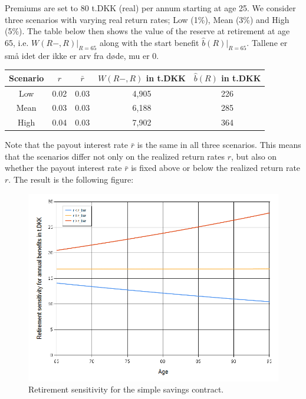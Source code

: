\documentclass{book}
\newcommand{\1}[1]{\mathbbm{1}_{\left\lbrace #1 \right\rbrace}}
\theoremstyle{break}
\theoremstyle{remark}
\numberwithin{equation}{section}
\begin{document}
\begin{example}
Premiums are set to 80 t.DKK (real) per annum starting at age 25. We consider three scenarios with varying real return rates; Low (1\%), Mean (3\%) and High (5\%). The table below then shows the value of the reserve at retirement at age 65, i.e. $W(R-,R)|_{R=65}$ along with the start benefit $\hat{b}(R)|_{R=65}$. Tallene er små idet der ikke er arv fra døde, mu er 0.

\begin{center}
	\begin{tabular}{ |c|c|c|c|c| }
		\hline
		Scenario & $r$ & $\bar{r}$ & $W(R-,R)$ in t.DKK & $\hat{b}(R)$ in t.DKK \\
		\hline
		Low & 0.02 & 0.03 & 4,905 & 226 \\
		Mean & 0.03 & 0.03 & 6,188 & 285 \\
		High & 0.04 & 0.03 & 7,902 & 364 \\
		\hline
	\end{tabular}
\end{center}

Note that the payout interest rate $\bar{r}$ is the same in all three scenarios. This means that the scenarios differ not only on the realized return rates $r$, but also on whether the payout interest rate $\bar{r}$ is fixed above or below the realized return rate $r$. The result is the following figure:

\begin{figure}[H] \label{RSensiGraph}
	\centering
	\caption{Retirement sensitivity for the simple savings contract.}
	\includegraphics[width=\textwidth]{Rsensi}		
\end{figure}


\end{example}
\end{document}
